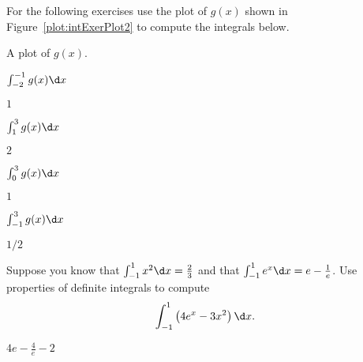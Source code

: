 \begin{exercises}
\noindent For the following exercises use the plot of $g(x)$ shown in
Figure~\ref{plot:intExerPlot2} to compute the integrals below.
\begin{marginfigure}[0in]
\caption{A plot of $g(x)$.}
\label{plot:intExerPlot2}
\end{marginfigure}

\twocol

\begin{exercise}
$\int_{-2}^{-1} g(x) \d x$
\begin{answer}
$1$
\end{answer}
\end{exercise}

\begin{exercise}
$\int_1^3 g(x) \d x$
\begin{answer}
$2$
\end{answer}
\end{exercise}

\begin{exercise}
$\int_0^3 g(x) \d x$
\begin{answer}
$1$
\end{answer}
\end{exercise}

\begin{exercise}
$\int_{-1}^3 g(x) \d x$
\begin{answer}
$1/2$
\end{answer}
\end{exercise}

\endtwocol

\begin{exercise}
Suppose you know that $\int_{-1}^1 x^2 \d x = \frac{2}{3}$ and that
$\int_{-1}^1 e^x \d x= e-\frac{1}{e}$. Use properties of definite
integrals to compute
\[
\int_{-1}^1 \left(4 e^x - 3 x^2\right) \d x.
\]
\begin{answer}
$4e - \frac{4}{e} - 2$
\end{answer}
\end{exercise}


\end{exercises}
